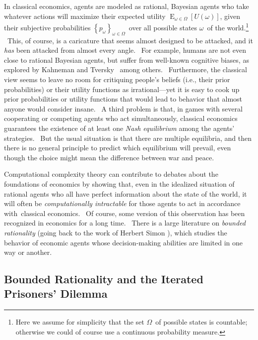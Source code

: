 \documentclass[12pt,onecolumn]{article}%
\begin{document}
In classical economics, agents are modeled as rational, Bayesian agents who
take whatever actions will maximize their expected utility $\operatorname*{E}%
_{\omega\in\Omega}\left[  U\left(  \omega\right)  \right]  $, given their
subjective probabilities $\left\{  p_{\omega}\right\}  _{\omega\in\Omega}%
$\ over all possible states $\omega$\ of the world.\footnote{Here we assume
for simplicity that the set $\Omega$\ of possible states is countable;
otherwise we could of course use a continuous probability measure.} \ This, of
course, is a caricature that seems almost designed to be attacked, and it
\textit{has} been attacked from almost every angle. \ For example, humans are
not even close to rational Bayesian agents, but suffer from well-known
cognitive biases, as explored by Kahneman and Tversky \cite{kahnemantversky}%
\ among others. \ Furthermore, the classical view seems to leave no room for
critiquing people's beliefs (i.e., their prior probabilities) or their utility
functions as irrational---yet it is easy to cook up prior probabilities or
utility functions that would lead to behavior that almost anyone would
consider insane. \ A third problem is that, in games with several cooperating
or competing agents who act simultaneously, classical economics guarantees the
existence of at least one \textit{Nash equilibrium} among the agents'
strategies. \ But the usual situation is that there are multiple equilibria,
and then there is no general principle to predict which equilibrium will
prevail, even though the choice might mean the difference between war and peace.

Computational complexity theory can contribute to debates about the
foundations of economics by showing that, even in the idealized situation of
rational agents who all have perfect information about the state of the world,
it will often be \textit{computationally intractable} for those agents to act
in accordance with\ classical economics. \ Of course, some version of this
observation has been recognized in economics for a long time. \ There is a
large literature on \textit{bounded rationality} (going back to the work of
Herbert Simon \cite{herbsimon}), which studies the behavior of economic agents
whose decision-making abilities are limited in one way or another.

\subsection{Bounded Rationality and the Iterated Prisoners' Dilemma\label{IPD}%
}
\end{document}
